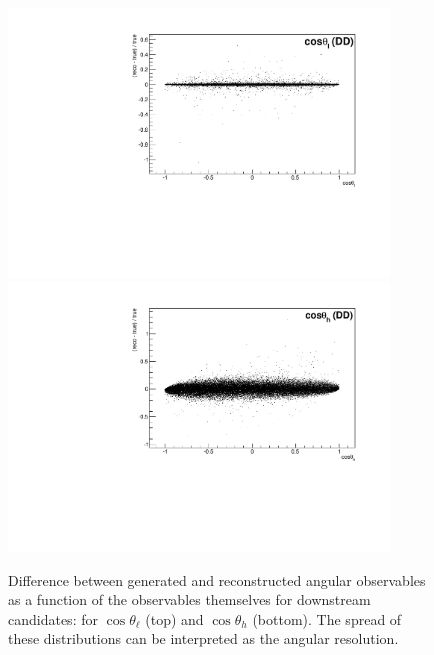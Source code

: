 \begin{figure}
\centering
\includegraphics[width=0.9\textwidth]{Lmumu/figs/resolution/RmT_vs_cosThetaL_DD.pdf}
\includegraphics[width=0.9\textwidth]{Lmumu/figs/resolution/RmT_vs_cosThetaB_DD.pdf}
 \caption{Difference between generated and reconstructed angular observables as a function of the 
 observables themselves for downstream candidates: for $\cos\theta_\ell$ (top) and $\cos\theta_h$ (bottom). 
 The spread of these distributions can be interpreted as the angular resolution.
 }
\label{fig:resolutionvsq2ang_DD}
\end{figure}
